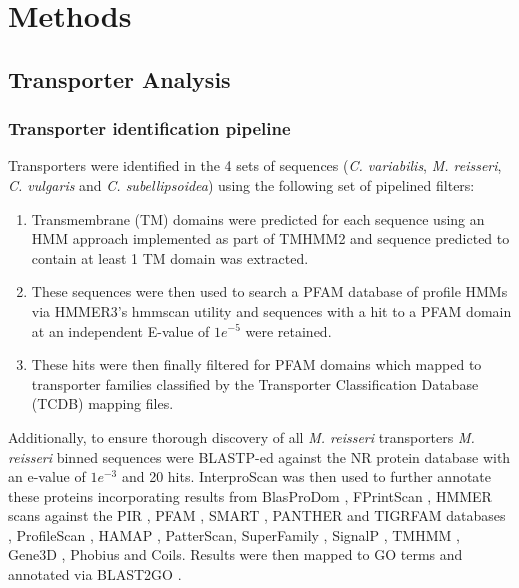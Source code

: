 \section{Methods}
\subsection{Transporter Analysis} 
\subsubsection{Transporter identification pipeline}
Transporters were identified in the 4 sets of sequences (\textit{C. variabilis}, \textit{M. reisseri},
\textit{C. vulgaris} and \textit{C. subellipsoidea}) using the following set of pipelined filters:
\begin{enumerate}
    \item Transmembrane (TM) domains were predicted for each sequence using an HMM approach implemented as part of TMHMM2 \citep{Sonnhammer1998,Krogh2001}
and sequence predicted to contain at least 1 TM domain was extracted.
    \item These sequences were then used to search a PFAM database of profile HMMs \citep{Eddy1998} via HMMER3's hmmscan utility \citep{Eddy1995,Johnson2010,Eddy2011,Mistry2013}
        and sequences with a hit to a PFAM domain at an independent E-value of \(1e^{-5}\) were retained.
    \item These hits were then finally filtered for PFAM domains which mapped to transporter families classified by the Transporter Classification Database (TCDB) \citep{Saier2006,Saier2008,Saier2009,Saier2014}
        mapping files.
\end{enumerate}

Additionally, to ensure thorough discovery of 
all \textit{M. reisseri} transporters \textit{M. reisseri} binned sequences 
were BLASTP-ed against the NR protein database with an e-value of \(1e^{-3}\) and 20 hits.
InterproScan \citep{Zdobnov2001a} was then used to 
further annotate these proteins incorporating
results from BlasProDom \citep{Servant2002}, FPrintScan \citep{Attwood1994}, 
HMMER \citep{Eddy2001} scans against the PIR \citep{Barker1998}, PFAM \citep{Bateman2002}, 
SMART \citep{Schultz1998}, PANTHER \citep{Thomas2003a} and TIGRFAM databases \citep{Haft2003}, 
ProfileScan \citep{Gribskov1988},
HAMAP \citep{Lima2009}, PatterScan, 
SuperFamily \citep{Gough2002}, 
SignalP \citep{Petersen2011}, TMHMM \citep{Sonnhammer1998}, 
Gene3D \citep{Buchan2002}, Phobius \citep{Kall2007}
and Coils. Results were then mapped to GO terms \citep{Ashburner2000,Harris2004}
and annotated via BLAST2GO \citep{Conesa2005a}.

